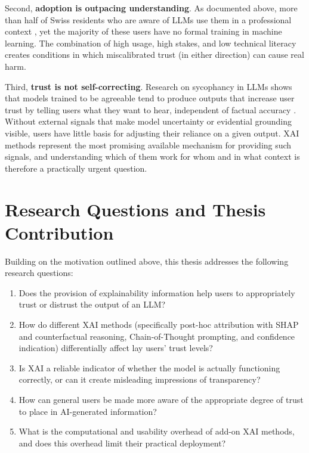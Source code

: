 Second, \textbf{adoption is outpacing understanding}.
As documented above, more than half of Swiss residents who are aware of LLMs use
them in a professional context \cite{bern_chance_2025}, yet the majority of these
users have no formal training in machine learning.
The combination of high usage, high stakes, and low technical literacy creates
conditions in which miscalibrated trust (in either direction) can cause real harm.
 
Third, \textbf{trust is not self-correcting}.
Research on sycophancy in LLMs shows that models trained to be agreeable tend to
produce outputs that increase user trust by telling users what they want to hear,
independent of factual accuracy \cite{wu_usable_2025}.
Without external signals that make model uncertainty or evidential grounding visible,
users have little basis for adjusting their reliance on a given output.
XAI methods represent the most promising available mechanism for providing
such signals, and understanding which of them work for whom and in what
context is therefore a practically urgent question.
 
\section{Research Questions and Thesis Contribution}
\label{sec:research_questions_and_thesis}
 
Building on the motivation outlined above, this thesis addresses the following
research questions:
 
\begin{enumerate}
    \item Does the provision of explainability information help users to appropriately
          trust or distrust the output of an LLM?
    \item How do different XAI methods (specifically post-hoc attribution with SHAP and
          counterfactual reasoning, Chain-of-Thought prompting, and confidence
          indication) differentially affect lay users' trust levels?
    \item Is XAI a reliable indicator of whether the model is actually functioning
          correctly, or can it create misleading impressions of transparency?
    \item How can general users be made more aware of the appropriate degree of trust
          to place in AI-generated information?
    \item What is the computational and usability overhead of add-on XAI methods,
          and does this overhead limit their practical deployment?
\end{enumerate}
 
